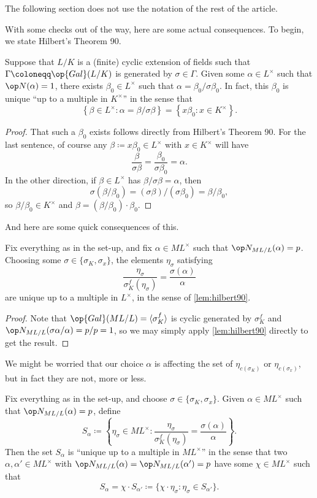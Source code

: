 \begin{warn}
	The following section does not use the notation of the rest of the article.
\end{warn}
With some checks out of the way, here are some actual consequences. To begin, we state Hilbert's Theorem 90.
\begin{lemma} \label{lem:hilbert90}
	Suppose that $L/K$ is a (finite) cyclic extension of fields such that $\Gamma\coloneqq\op{Gal}(L/K)$ is generated by $\sigma\in\Gamma$. Given some $\alpha\in L^\times$ such that $\op N(\alpha)=1$, there exists $\beta_0\in L^\times$ such that $\alpha=\beta_0/\sigma\beta_0$. In fact, this $\beta_0$ is unique ``up to a multiple in $K^\times$'' in the sense that
	\[\left\{\beta\in L^\times:\alpha=\beta/\sigma\beta\right\}=\left\{x\beta_0:x\in K^\times\right\}.\]
\end{lemma}
\begin{proof}
	That such a $\beta_0$ exists follows directly from Hilbert's Theorem 90. For the last sentence, of course any $\beta\coloneqq x\beta_0\in L^\times$ with $x\in K^\times$ will have
	\[\frac\beta{\sigma\beta}=\frac{\beta_0}{\sigma\beta_0}=\alpha.\]
	In the other direction, if $\beta\in L^\times$ has $\beta/\sigma\beta=\alpha$, then
	\[\sigma(\beta/\beta_0)=(\sigma\beta)/(\sigma\beta_0)=\beta/\beta_0,\]
	so $\beta/\beta_0\in K^\times$ and $\beta=(\beta/\beta_0)\cdot\beta_0$.
\end{proof}
And here are some quick consequences of this.
\begin{cor}
	Fix everything as in the set-up, and fix $\alpha\in ML^\times$ such that $\op N_{ML/L}(\alpha)=p$. Choosing some $\sigma\in\{\sigma_K,\sigma_x\}$, the elements $\eta_{\sigma}$ satisfying
	\[\frac{\eta_{\sigma}}{\sigma_K^f\left(\eta_{\sigma}\right)}=\frac{\sigma(\alpha)}{\alpha}\]
	are unique up to a multiple in $L^\times$, in the sense of \autoref{lem:hilbert90}.
\end{cor}
\begin{proof}
	Note that $\op{Gal}(ML/L)=\langle\sigma_K^f\rangle$ is cyclic generated by $\sigma_K^f$ and $\op N_{ML/L}(\sigma\alpha/\alpha)=p/p=1$, so we may simply apply \autoref{lem:hilbert90} directly to get the result.
\end{proof}
We might be worried that our choice $\alpha$ is affecting the set of $\eta_{c(\sigma_K)}$ or $\eta_{c(\sigma_x)}$, but in fact they are not, more or less.
\begin{cor} \label{cor:updatealpha}
	Fix everything as in the set-up, and choose $\sigma\in\{\sigma_K,\sigma_x\}$. Given $\alpha\in ML^\times$ such that $\op N_{ML/L}(\alpha)=p$, define
	\[S_\alpha\coloneqq\left\{\eta_\sigma\in ML^\times:\frac{\eta_{\sigma}}{\sigma_K^f\left(\eta_{\sigma}\right)}=\frac{\sigma(\alpha)}{\alpha}\right\}.\]
	Then the set $S_\alpha$ is ``unique up to a multiple in $ML^\times$'' in the sense that two $\alpha,\alpha'\in ML^\times$ with $\op N_{ML/L}(\alpha)=\op N_{ML/L}(\alpha')=p$ have some $\chi\in ML^\times$ such that
	\[S_{\alpha}=\chi\cdot S_{\alpha'}\coloneqq\{\chi\cdot \eta_\sigma:\eta_\sigma\in S_{\alpha'}\}.\]
\end{cor}
